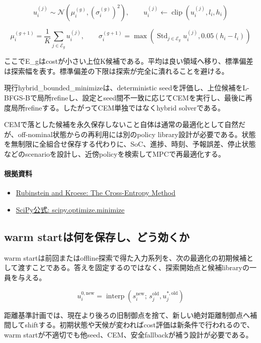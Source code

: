 \documentclass[a4paper,11pt]{article}
\begin{document}
\[
u_i^{(j)} \sim \mathcal{N}(\mu_i^{(g)},(\sigma_i^{(g)})^2),\qquad u_i^{(j)}\leftarrow\operatorname{clip}(u_i^{(j)},l_i,h_i)
\]

\[
\mu_i^{(g+1)}=\frac{1}{K}\sum_{j\in\mathcal{E}_g}u_i^{(j)},\qquad \sigma_i^{(g+1)}=\max\left(\operatorname{Std}_{j\in\mathcal{E}_g}u_i^{(j)},0.05(h_i-l_i)\right)
\]

ここでE\_gはcostが小さい上位K候補である。平均は良い領域へ移り、標準偏差は探索幅を表す。標準偏差の下限は探索が完全に潰れることを避ける。


現行hybrid\_bounded\_minimizeは、deterministic seedを評価し、上位候補をL-BFGS-Bで局所refineし、設定とseed間不一致に応じてCEMを実行し、最後に再度局所refineする。したがってCEM単独ではなくhybrid solverである。


CEMで落とした候補を永久保存しないこと自体は通常の最適化として自然だが、off-nominal状態からの再利用には別のpolicy library設計が必要である。状態を無制限に全組合せ保存する代わりに、SoC、進捗、時刻、予報誤差、停止状態などのscenarioを設計し、近傍policyを検索してMPCで再最適化する。

\paragraph{根拠資料}
\begin{itemize}[leftmargin=1.6em]
\item \href{https://link.springer.com/book/10.1007/978-1-4757-4321-0}{Rubinstein and Kroese: The Cross-Entropy Method}
\item \href{https://docs.scipy.org/doc/scipy/reference/generated/scipy.optimize.minimize.html}{SciPy公式: scipy.optimize.minimize}
\end{itemize}

\subsection{warm startは何を保存し、どう効くか}
warm startは前回またはoffline探索で得た入力系列を、次の最適化の初期候補として渡すことである。答えを固定するのではなく、探索開始点と候補libraryの一員を与える。


\[
u^{0,\mathrm{new}}_i=\operatorname{interp}\left(s_i^{\mathrm{new}};\,s_j^{\mathrm{old}},u_j^{\ast,\mathrm{old}}\right)
\]

距離基準計画では、現在より後ろの旧制御点を捨て、新しい絶対距離制御点へ補間してshiftする。初期状態や天候が変わればcost評価は新条件で行われるので、warm startが不適切でも他seed、CEM、安全fallbackが補う設計が必要である。
\end{document}
